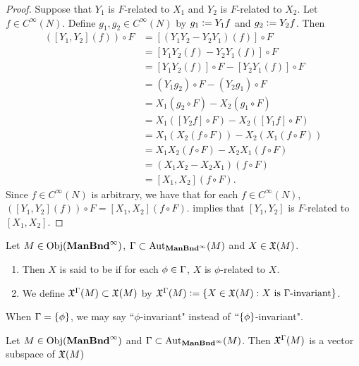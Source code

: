 \documentclass{book}
\begin{document}
\begin{proof}
	Suppose that $Y_1$ is $F$-related to $X_1$ and $Y_2$ is $F$-related to $X_2$. Let $f \in C^{\infty}(N)$. Define $g_1, g_2 \in C^{\infty}(N)$ by $g_1 \vcentcolon= Y_1f$ and $g_2 \vcentcolon= Y_2f$. Then 
	\begin{align*}
		([Y_1, Y_2] (f)) \circ F 
		& = [(Y_1 Y_2 - Y_2Y_1)(f)] \circ F \\
		& = [Y_1 Y_2(f) -  Y_2Y_1(f)] \circ F \\
		& = [Y_1 Y_2(f)] \circ F - [Y_2Y_1(f)] \circ F \\
		& = (Y_1 g_2) \circ F - (Y_2 g_1) \circ F \\
		& = X_1(g_2 \circ F) - X_2(g_1 \circ F) \\
		& = X_1( [Y_2f] \circ F ) - X_2( [Y_1f] \circ F ) \\
		& = X_1( X_2(f \circ F) ) - X_2(X_1(f \circ F)) \\
		& = X_1X_2(f \circ F) - X_2X_1(f \circ F) \\
		& = (X_1X_2 - X_2X_1)(f \circ F) \\
		& = [X_1, X_2] (f \circ F).
	\end{align*}
	Since $f \in C^{\infty}(N)$ is arbitrary, we have that for each $f \in C^{\infty}(N)$, $([Y_1, Y_2] (f)) \circ F = [X_1, X_2](f \circ F)$.  implies that $[Y_1, Y_2]$ is $F$-related to $[X_1, X_2]$. 
\end{proof}

\begin{defn} 
	Let $M \in \operatorname{Obj}(\operatorname*{\text{\textbf{ManBnd}}^{\infty}})$, $\Gamma \subset \operatorname{Aut}_{\operatorname*{\text{\textbf{ManBnd}}^{\infty}}}(M)$ and $X \in \mathfrak{X}(M)$.
	\begin{enumerate}
		\item Then $X$ is said to be  if for each $\phi \in \Gamma$, $X$ is $\phi$-related to $X$. \\
		\item We define $\mathfrak{X}^{\Gamma}(M) \subset \mathfrak{X}(M)$ by $\mathfrak{X}^{\Gamma}(M) \vcentcolon= \{X \in \mathfrak{X}(M): X \text{ is $\Gamma$-invariant}\}$.
	\end{enumerate}
\end{defn}

\begin{note} 
	When $\Gamma = \{\phi\}$, we may say ``$\phi$-invariant" instead of $``\{\phi\}$-invariant".
\end{note}

\begin{ex} 
	Let $M \in \operatorname{Obj}(\operatorname*{\text{\textbf{ManBnd}}^{\infty}})$ and $\Gamma \subset \operatorname{Aut}_{\operatorname*{\text{\textbf{ManBnd}}^{\infty}}}(M)$. Then $\mathfrak{X}^{\Gamma}(M)$ is a vector subspace of $\mathfrak{X}(M)$
\end{ex}
\end{document}
